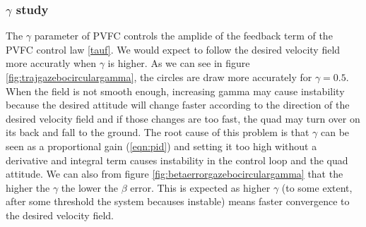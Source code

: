 \subsubsection{$\gamma$ study}
The $\gamma$ parameter of PVFC controls the amplide of the feedback term of the PVFC control law \ref{tauf}.
We would expect to follow the desired velocity field more accuratly when $\gamma$ is higher.
As we can see in figure \ref{fig:trajgazebocirculargamma}, the circles are draw more accurately for $\gamma=0.5$.
When the field is not smooth enough, increasing gamma may cause instability because the desired attitude will change faster according to the direction of the desired
velocity field and if those changes are too fast, the quad may turn over on its back and fall to the ground. The root cause of this problem is that $\gamma$ can be seen as a proportional gain (\ref{eqn:pid}) and setting it too high without a derivative and integral term causes instability in the control loop and the quad attitude.
We can also from figure \ref{fig:betaerrorgazebocirculargamma} that the higher the $\gamma$ the lower the $\beta$ error. This is expected as higher $\gamma$ (to some extent, after some threshold the system becauses instable) means faster convergence to the desired velocity field.

